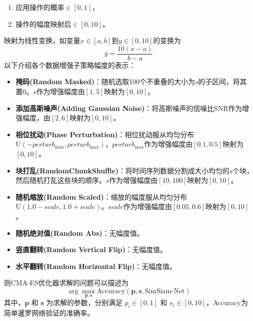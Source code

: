 \documentclass[master]{thesis-uestc}
\begin{document}
\begin{enumerate}[label={(\arabic*)}]
    \item 应用操作的概率\(\in [0,1]\)，
    \item 操作的幅度映射后\(\in [0,10]\)。
\end{enumerate}
映射为线性变换，如变量\(x \in [a,b]\)到\(y \in [0,10]\)的变换为
\begin{equation}
    y = \frac{10(x - a)}{b - a}
    \end{equation}
以下介绍各个数据增强子策略幅度的表示：
\begin{itemize}
    \item \textbf{掩码(Random Masked)}：随机选取100个不重叠的大小为$s$的子区间，将其置0。$s$作为增强幅度由\([1,5]\)映射为\([0,10]\)。

    \item \textbf{添加高斯噪声(Adding Gaussian Noise)}：将高斯噪声的信噪比SNR作为增强幅度，由\([2,6]\)映射为\([0,10]\)。

    \item \textbf{相位扰动(Phase Perturbation)}：相位扰动服从均匀分布$\text{U}(-perturb_{\text{max}}, perturb_{\text{max}})$，$perturb_{\text{max}}$作为增强幅度由\([0.1,0.5]\)映射为\([0,10]\)。

    \item \textbf{块打乱(RandomChunkShuffle)}：将时间序列数据分割成大小均匀的$s$个块，然后随机打乱这些块的顺序。$s$作为增强幅度由\([10,100]\)映射为\([0,10]\)。

    \item \textbf{随机缩放(Random Scaled)}：缩放的幅度服从均匀分布$\text{U}(1.0-scale, 1.0+scale)$。$scale$作为增强幅度由\([0.05,0.6]\)映射为\([0,10]\)。

    \item \textbf{随机绝对值(Random Abs)}：无幅度值。

    \item \textbf{竖直翻转(Random Vertical Flip)}：无幅度值。

    \item \textbf{水平翻转(Random Horizontal Flip)}：无幅度值。
    
\end{itemize}
则CMA-ES优化器求解的问题可以描述为 
\begin{equation}
    \arg\max_{\mathbf{p}, \mathbf{s}} \text{Accuracy}(\mathbf{p}, \mathbf{s}, \text{SimSiam-Net})
\end{equation}
其中，\(\mathbf{p}\) 和 \(\mathbf{s}\) 为求解的参数，分别满足 \(p_i \in [0, 1]\) 和 \(s_i \in [0, 10]\)，Accuracy为简单暹罗网络验证的准确率。
\FloatBarrier  %
\end{document}
